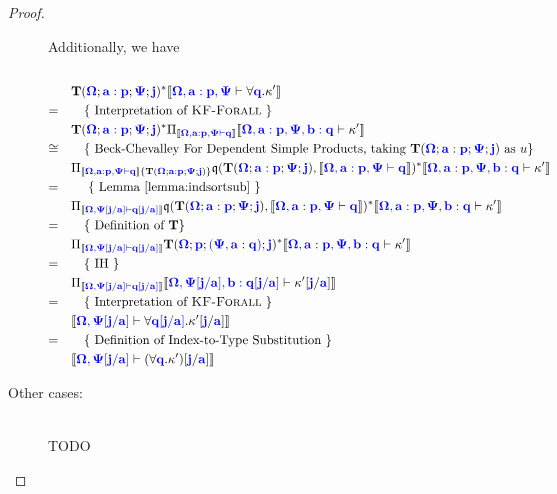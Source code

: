 \documentclass[sigplan,10pt,review,anonymous]{acmart}
\newcommand{\blu}[1]{\textbf{\color{blue}{#1}}}
\newcommand{\blum}[1]{\mathbf{\color{blue}{#1}}}
\newcommand{\sem}[1]{\llbracket #1 \rrbracket}
\newcommand{\mbf}[1]{\mathbf{#1}}
\begin{document}
\begin{proof}
\begin{description}
Additionally, we have\\~\\
\begin{align*}
 &\quad \mbf{T}(\blum{\Omega} ; \blum{a : p} ; \blum{\Psi} ; \blu{j})^* \sem{\blum{\Omega,a:p,\Psi} \vdash \forall \blum{q}. \kappa'}\\
=&\qquad \text{\{ Interpretation of \begin{sc}KF-Forall\end{sc} \}} \\
 &\quad \mbf{T}(\blum{\Omega} ; \blum{a : p} ; \blum{\Psi} ; \blu{j})^* \Pi_{\sem{\blum{\Omega, a : p, \Psi \vdash q}}} \sem{\blum{\Omega,a:p,\Psi,b:q} \vdash \kappa'}\\
\cong&\qquad \text{\{ Beck-Chevalley For Dependent Simple Products, taking } \mbf{T}(\blum{\Omega} ; \blum{a : p} ; \blum{\Psi} ; \blu{j}) \text{ as } u \}\\
 &\quad \Pi_{ \sem{\blum{\Omega, a : p, \Psi \vdash q}} \{ \mbf{T}(\blum{\Omega} ; \blum{a : p} ; \blum{\Psi} ; \blu{j}) \} } \frak q(\mbf{T}(\blum{\Omega} ; \blum{a : p} ; \blum{\Psi} ; \blu{j}) , \sem{\blum{\Omega, a:p, \Psi \vdash q}})^* \sem{\blum{\Omega,a:p,\Psi,b : q} \vdash \kappa'}\\
=&\qquad \text{ \{ Lemma \ref{lemma:indsortsub} \}}\\
 &\quad \Pi_{ \sem{\blum{\Omega, \Psi[j/a] \vdash q[j/a]}} } \frak q(\mbf{T}(\blum{\Omega} ; \blum{a : p} ; \blum{\Psi} ; \blu{j}) , \sem{\blum{\Omega, a:p, \Psi \vdash q}})^* \sem{\blum{\Omega,a:p,\Psi,b:q} \vdash \kappa'}\\
=&\qquad \text{\{ Definition of } \mbf{T} \}\\
 &\quad \Pi_{ \sem{\blum{\Omega, \Psi[j/a] \vdash q[j/a]}} } \mbf T(\blum{\Omega}; \blum{p} ; \blum{(\Psi, a : q)}; \blum{j})^* \sem{\blum{\Omega,a:p,\Psi,b:q} \vdash \kappa'}\\
=&\qquad \text{\{ IH \}} \\ 
 &\quad \Pi_{ \sem{\blum{\Omega, \Psi[j/a] \vdash q[j/a]}} } \sem{\blum{\Omega,\Psi[j/a],b:q[j/a]} \vdash \kappa'[\blum{j}/\blum{a}]}\\
=&\qquad \text{\{ Interpretation of \begin{sc}KF-Forall\end{sc} \}}\\
 &\quad \sem{\blum{\Omega,\Psi[j/a]} \vdash \forall \blum{q[j/a]}. \kappa'[\blum{j}/\blum{a}]}\\
=&\qquad \text{\{ Definition of Index-to-Type Substitution \}}\\
 &\quad \sem{\blum{\Omega,\Psi[j/a]} \vdash (\forall \blum{q}. \kappa')[\blum{j}/\blum{a}]}
\end{align*}

\item[Other cases:]~\\
TODO
\end{description}

\end{proof}
\end{document}

